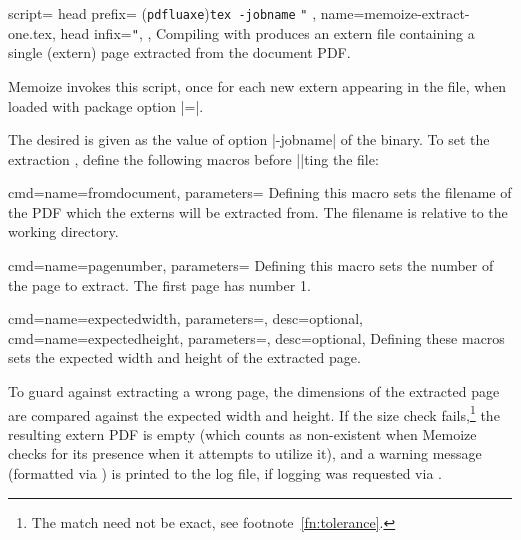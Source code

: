 \documentclass[a4paper,11pt]{article}
\begin{document}
\begin{doc}{
    script={
      head prefix={%
        (\texttt{pdf}\alt\texttt{lua}\alt\texttt{xe})\texttt{tex -jobname}
        \texttt{"}
        \texttt{\textbraceleft}
      },
      name=memoize-extract-one.tex,
      head infix=\texttt{\textbraceright"},
    },
  }
  Compiling  with 
  produces an extern file containing a single (extern) page extracted from the
  document PDF.

  Memoize invokes this script, once for each new extern appearing in the \dmmz
  file, when loaded with package option
  |=|.
  
  The desired  is given as the value of option |-jobname|
  of the  binary.  To set the extraction , define
  the following macros before ||ting the file:
  \begin{doc}{cmd={name=fromdocument, parameters=}}
    Defining this macro sets the filename of the PDF which the externs will be
    extracted from.  The filename is relative to the working directory.
  \end{doc}
  \begin{doc}{cmd={name=pagenumber, parameters=}}
    Defining this macro sets the number of the page to extract.  The first page
    has number 1.
  \end{doc}
  \begin{doc}{
      cmd={name=expectedwidth, parameters=, desc=optional},
      cmd={name=expectedheight, parameters=, desc=optional},
    }
    Defining these macros sets the expected width and height of the extracted
    page.

    To guard against extracting a wrong page, the dimensions of the extracted
    page are compared against the expected width and height.  If the size check
    fails,\footnote{The match need not be exact, see
      footnote~\ref{fn:tolerance}.} the resulting extern PDF is empty (which
    counts as non-existent when Memoize checks for its presence when it
    attempts to utilize it), and a warning message (formatted via
    ) is printed to the log file, if logging was
    requested via .
    

\end{doc}
\end{doc}
\end{document}
